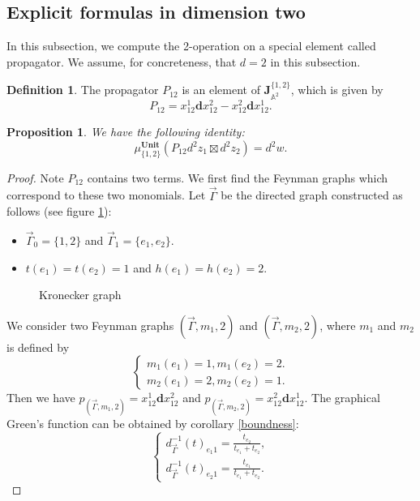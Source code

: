 \documentclass[11pt]{amsart}
\newtheorem{prop}[thm]{Proposition}
\theoremstyle{definition}
\newtheorem{defn}[thm]{Definition}
\theoremstyle{remark}
\numberwithin{equation}{section}
\begin{document}
\subsection{Explicit formulas in dimension two}
In this subsection, we compute the 2-operation on a special element called propagator. 
We assume, for concreteness, that $d=2$ in this subsection.
\begin{defn}
    The propagator $P_{12}$ is an element of $\mathbf{J}^{\{1,2\}}_{\mathbb{A}^{2}}$, which is given by 
    $$
    P_{12}=x_{12}^1\mathbf{d}x_{12}^{2}-x_{12}^2\mathbf{d}x_{12}^{1}.
    $$
    \begin{prop}
        We have the following identity:
        $$
        \mu^{\mathbf{Unit}}_{\{1,2\}}(P_{12}d^{2}z_{1}\boxtimes d^{2}z_{2})=d^{2}w.
        $$
    \end{prop}
    \begin{proof}
    Note $P_{12}$ contains two terms. We first find the Feynman graphs which correspond to these two monomials. Let
    $\vec{\Gamma}$ be the directed graph constructed as follows (see figure \ref{fig:kronecker-quiver}):
        \begin{itemize}
            \item $\vec{\Gamma}_{0}=\{1,2\}$ and $\vec{\Gamma}_{1}=\{e_{1},e_{2}\}$.
            \item $t(e_{1})=t(e_{2})=1$ and $h(e_{1})=h(e_{2})=2$.
        \end{itemize}
\begin{figure}[ht]
  \centering
  \caption{Kronecker graph}
  \label{fig:kronecker-quiver}
\end{figure}
        We consider two Feynman graphs $(\vec{\Gamma},m_{1},2)$ and $(\vec{\Gamma},m_{2},2)$, where $m_{1}$ and $m_{2}$ is defined by
        $$
        \begin{cases}
            m_{1}(e_{1})=1, m_{1}(e_{2})=2.\\
            m_{2}(e_{1})=2, m_{2}(e_{2})=1.
        \end{cases}
        $$
        Then we have $p_{(\vec{\Gamma},m_{1},2)}=x_{12}^1\mathbf{d}x_{12}^{2}$ and $p_{(\vec{\Gamma},m_{2},2)}=x_{12}^{2}
        \mathbf{d}x_{12}^{1}$. The graphical Green's function can be obtained by corollary \ref{boundness}:
        $$
        \begin{cases}
            d^{-1}_{\vec{\Gamma}}(t)_{e_{1}1}=\frac{t_{e_{2}}}{t_{e_{1}}+t_{e_{2}}},\\
            d^{-1}_{\vec{\Gamma}}(t)_{e_{2}1}=\frac{t_{e_{1}}}{t_{e_{1}}+t_{e_{2}}}.
        \end{cases}
        $$
        

\end{proof}
\end{defn}
\end{document}

